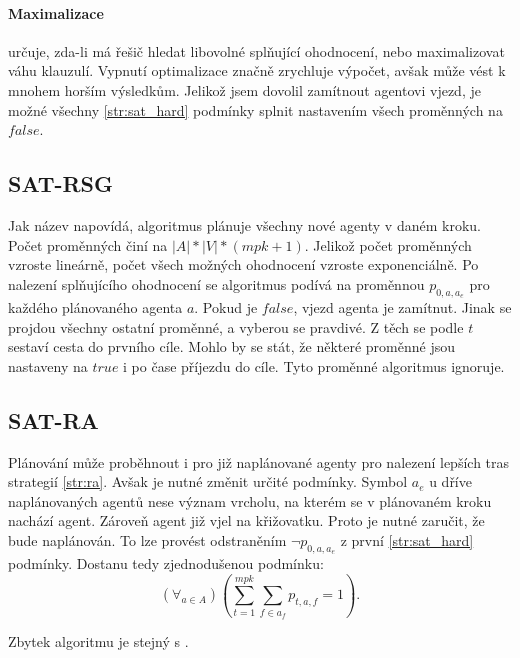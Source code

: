 \paragraph{Maximalizace} určuje, zda-li má řešič hledat libovolné splňující ohodnocení,
nebo maximalizovat váhu klauzulí.
Vypnutí optimalizace značně zrychluje výpočet, avšak může vést k mnohem horším výsledkům.
Jelikož jsem dovolil zamítnout agentovi vjezd, je možné všechny \ref{str:sat_hard} podmínky splnit
nastavením všech proměnných na $false$.

\subsection{SAT-RSG}\label{subsec:sat_rsg}
Jak název napovídá, algoritmus plánuje všechny nové agenty v daném kroku.
Počet proměnných činí na $|A| * |V| * (mpk + 1)$.
Jelikož počet proměnných vzroste lineárně, počet všech možných ohodnocení vzroste exponenciálně.
Po nalezení splňujícího ohodnocení se algoritmus podívá na proměnnou $p_{0, a, a_e}$ pro každého plánovaného agenta $a$.
Pokud je $false$, vjezd agenta je zamítnut.
Jinak se projdou všechny ostatní proměnné, a vyberou se pravdivé.
Z těch se podle $t$ sestaví cesta do prvního cíle.
Mohlo by se stát, že některé proměnné jsou nastaveny na $true$ i po čase příjezdu do cíle.
Tyto proměnné algoritmus ignoruje.


\subsection{SAT-RA}\label{subsec:sat_ra}

Plánování může proběhnout i pro již naplánované agenty pro nalezení lepších tras strategií \ref{str:ra}.
Avšak je nutné změnit určité podmínky.
Symbol $a_e$ u dříve naplánovaných agentů nese význam vrcholu, na kterém se v plánovaném kroku nachází agent.
Zároveň agent již vjel na křižovatku.
Proto je nutné zaručit, že bude naplánován.
To lze provést odstraněním $\neg p_{0, a, a_e}$ z první \ref{str:sat_hard} podmínky.
Dostanu tedy zjednodušenou podmínku:
\[
	(\forall_{a \in A}) \left(\sum_{t=1}^{mpk} \sum_{f \in a_f} p_{t, a, f} = 1\right).
\]

Zbytek algoritmu je stejný s .
